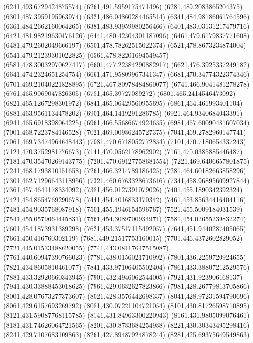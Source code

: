 {(6241,493.6729424875574)
(6261,491.5959175471496)
(6281,489.2083865204375)
(6301,487.3959195963974)
(6321,486.04860284465514)
(6341,484.98186061764596)
(6361,484.2662160064265)
(6381,483.93959980256466)
(6401,483.03131217479716)
(6421,481.98219630476126)
(6441,480.42304301187096)
(6461,479.6179837771608)
(6481,479.2602049666197)
(6501,478.78262515022374)
(6521,478.8673234874004)
(6541,479.21239301022825)
(6561,478.82201694549457)
(6581,478.30032970627417)
(6601,477.22384290882917)
(6621,476.3925337249182)
(6641,474.2324651254754)
(6661,471.95809967341347)
(6681,470.34774322374346)
(6701,469.21040221828895)
(6721,467.80978484860077)
(6741,466.9041481278278)
(6761,465.9069047826305)
(6781,465.39727089272)
(6801,465.2414546473092)
(6821,465.1267298301972)
(6841,465.06429560955695)
(6861,464.461993401104)
(6881,463.9561134478202)
(6901,464.1419291286785)
(6921,464.9340684043391)
(6941,465.6918398064225)
(6961,466.55686674924635)
(6981,467.60090481607034)
(7001,468.7223784146528)
(7021,469.00986245727375)
(7041,469.2782960147741)
(7061,469.73474964648443)
(7081,470.6718052772834)
(7101,470.7180654337243)
(7121,470.3752981776673)
(7141,470.0562178962902)
(7161,470.0385885446487)
(7181,470.35470269143775)
(7201,470.69127758681554)
(7221,469.6406657801875)
(7241,468.1793810151658)
(7261,466.3214789186425)
(7281,464.60182663858296)
(7301,462.71296643118956)
(7321,460.6763328673616)
(7341,458.96895609927844)
(7361,457.4641178334092)
(7381,456.0127391079026)
(7401,455.1890342392324)
(7421,454.8654769290678)
(7441,454.4016833170342)
(7461,453.85634416404116)
(7481,454.9035768087918)
(7501,455.1946154596767)
(7521,455.5009184031539)
(7541,455.0579664445831)
(7561,454.3089700934971)
(7581,454.02655239832274)
(7601,454.1873931389298)
(7621,453.37517115492057)
(7641,451.9440287405065)
(7661,450.416760302119)
(7681,449.21517753160015)
(7701,446.4372602829052)
(7721,445.01533488620055)
(7741,443.08117647515087)
(7761,440.60947390766023)
(7781,438.0156021710992)
(7801,436.2259720924655)
(7821,434.8605810461077)
(7841,433.97106405502404)
(7861,433.38807212529576)
(7881,433.32920660343945)
(7901,432.4946062544005)
(7921,431.923906168137)
(7941,430.33888453018625)
(7961,429.0682627823866)
(7981,428.26779813705866)
(8001,428.07673277373607)
(8021,428.3576442698337)
(8041,428.97231594790696)
(8061,429.6157693269792)
(8081,430.07221104721054)
(8101,430.81726598710895)
(8121,431.59087768115785)
(8141,431.84963300220943)
(8161,431.9805099076461)
(8181,431.74626064721565)
(8201,430.8783684254988)
(8221,430.30343495298416)
(8241,429.7107683109863)
(8261,427.89487924878244)
(8281,425.69375649549863)
}
